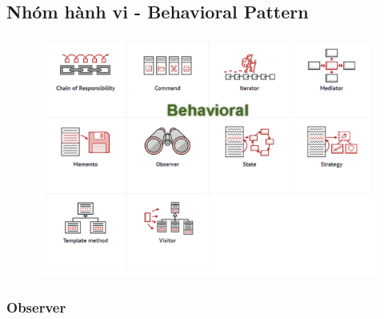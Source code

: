 \documentclass{article}
\begin{document}
    \begin{center}
        \hspace{0pt}
        \vfill
        \fontsize{30}{20}\selectfont\part{Nhóm hành vi - Behavioral Pattern}
        \begin{figure}[htp]
            \begin{center}
                \includegraphics[scale=0.65]{./image/behavioral-pattern.png}
            \end{center}
        \end{figure}
        \vfill
        \hspace{0pt}
    \end{center}
    \pagebreak

    \section{Observer}
\end{document}
